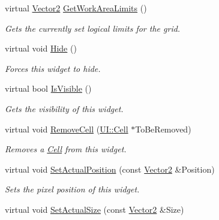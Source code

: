 \begin{DoxyCompactItemize}
virtual \hyperlink{classphys_1_1Vector2}{Vector2} \hyperlink{classphys_1_1UI_1_1CellGrid_a328392c90b93da93354756607e328e0c}{GetWorkAreaLimits} ()
\begin{DoxyCompactList}\small\item\em Gets the currently set logical limits for the grid. \item\end{DoxyCompactList}\item 
\hypertarget{classphys_1_1UI_1_1CellGrid_a8f1ea23b55724f3346a6c32c87f4eabc}{
virtual void \hyperlink{classphys_1_1UI_1_1CellGrid_a8f1ea23b55724f3346a6c32c87f4eabc}{Hide} ()}
\label{classphys_1_1UI_1_1CellGrid_a8f1ea23b55724f3346a6c32c87f4eabc}

\begin{DoxyCompactList}\small\item\em Forces this widget to hide. \item\end{DoxyCompactList}\item 
virtual bool \hyperlink{classphys_1_1UI_1_1CellGrid_af53601ab18e77237550c3eb97043e68c}{IsVisible} ()
\begin{DoxyCompactList}\small\item\em Gets the visibility of this widget. \item\end{DoxyCompactList}\item 
virtual void \hyperlink{classphys_1_1UI_1_1CellGrid_af7ff6b201aa24939c82ee34e96e67a32}{RemoveCell} (\hyperlink{classphys_1_1UI_1_1Cell}{UI::Cell} $\ast$ToBeRemoved)
\begin{DoxyCompactList}\small\item\em Removes a \hyperlink{classphys_1_1UI_1_1Cell}{Cell} from this widget. \item\end{DoxyCompactList}\item 
virtual void \hyperlink{classphys_1_1UI_1_1CellGrid_a911ce43c124ca7ac9f02ba7d8e08d919}{SetActualPosition} (const \hyperlink{classphys_1_1Vector2}{Vector2} \&Position)
\begin{DoxyCompactList}\small\item\em Sets the pixel position of this widget. \item\end{DoxyCompactList}\item 
virtual void \hyperlink{classphys_1_1UI_1_1CellGrid_a86a0ff7a5a916278d901bae05df01847}{SetActualSize} (const \hyperlink{classphys_1_1Vector2}{Vector2} \&Size)

\end{DoxyCompactItemize}
